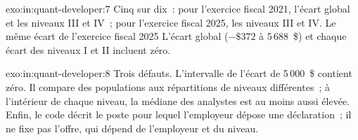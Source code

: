 \begin{solution}{exo:in:quant-developer:7}
Cinq sur dix~: pour l'exercice fiscal 2021, l'écart global et les niveaux III et IV~; pour l'exercice fiscal 2025, les niveaux III et IV. Le même écart de l'exercice fiscal 2025
L'écart global ($-\$372$ à 5\,688~\$) et chaque écart des niveaux I et II incluent zéro.
\end{solution}

\begin{solution}{exo:in:quant-developer:8}
Trois défauts. L'intervalle de l'écart de 5\,000~\$ contient zéro. Il compare des populations aux répartitions de niveaux différentes~; à l'intérieur de chaque
niveau, la médiane des analystes est au moins aussi élevée. Enfin, le code décrit le poste pour lequel l'employeur dépose une déclaration~; il ne fixe pas
l'offre, qui dépend de l'employeur et du niveau.
\end{solution}

